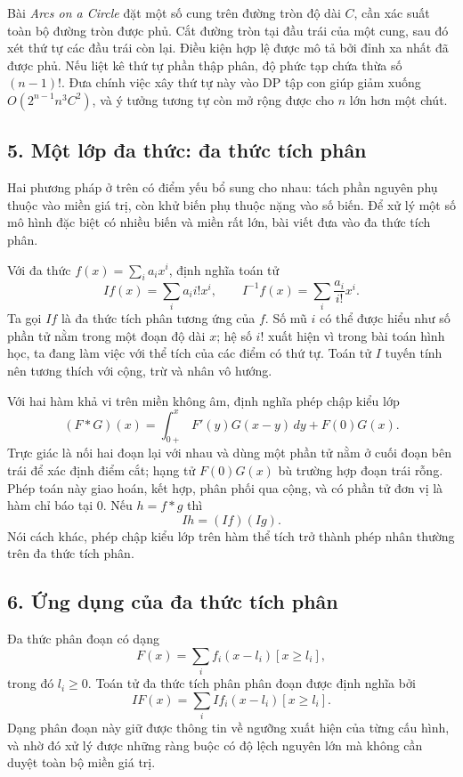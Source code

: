 \documentclass[11pt]{article}
\begin{document}
Bài \emph{Arcs on a Circle} đặt một số cung trên đường tròn độ dài \(C\), cần
xác suất toàn bộ đường tròn được phủ. Cắt đường tròn tại đầu trái của một cung,
sau đó xét thứ tự các đầu trái còn lại. Điều kiện hợp lệ được mô tả bởi đỉnh xa
nhất đã được phủ. Nếu liệt kê thứ tự phần thập phân, độ phức tạp chứa thừa số
\((n-1)!\). Đưa chính việc xây thứ tự này vào DP tập con giúp giảm xuống
\(O(2^{n-1}n^3C^2)\), và ý tưởng tương tự còn mở rộng được cho \(n\) lớn hơn
một chút.

\subsection*{5. Một lớp đa thức: đa thức tích phân}

Hai phương pháp ở trên có điểm yếu bổ sung cho nhau: tách phần nguyên phụ
thuộc vào miền giá trị, còn khử biến phụ thuộc nặng vào số biến. Để xử lý một
số mô hình đặc biệt có nhiều biến và miền rất lớn, bài viết đưa vào đa thức
tích phân.

Với đa thức \(f(x)=\sum_i a_i x^i\), định nghĩa toán tử
\[
  If(x)=\sum_i a_i i! x^i,
  \qquad
  I^{-1}f(x)=\sum_i \frac{a_i}{i!}x^i.
\]
Ta gọi \(If\) là đa thức tích phân tương ứng của \(f\). Số mũ \(i\) có thể được
hiểu như số phần tử nằm trong một đoạn độ dài \(x\); hệ số \(i!\) xuất hiện vì
trong bài toán hình học, ta đang làm việc với thể tích của các điểm có thứ tự.
Toán tử \(I\) tuyến tính nên tương thích với cộng, trừ và nhân vô hướng.

Với hai hàm khả vi trên miền không âm, định nghĩa phép chập kiểu lớp
\[
  (F*G)(x)=\int_{0+}^{x} F'(y)G(x-y)\,dy+F(0)G(x).
\]
Trực giác là nối hai đoạn lại với nhau và dùng một phần tử nằm ở cuối đoạn bên
trái để xác định điểm cắt; hạng tử \(F(0)G(x)\) bù trường hợp đoạn trái rỗng.
Phép toán này giao hoán, kết hợp, phân phối qua cộng, và có phần tử đơn vị là
hàm chỉ báo tại \(0\). Nếu \(h=f*g\) thì
\[
  Ih=(If)(Ig).
\]
Nói cách khác, phép chập kiểu lớp trên hàm thể tích trở thành phép nhân thường
trên đa thức tích phân.

\subsection*{6. Ứng dụng của đa thức tích phân}

Đa thức phân đoạn có dạng
\[
  F(x)=\sum_i f_i(x-l_i)[x\ge l_i],
\]
trong đó \(l_i\ge 0\). Toán tử đa thức tích phân phân đoạn được định nghĩa bởi
\[
  IF(x)=\sum_i I f_i(x-l_i)[x\ge l_i].
\]
Dạng phân đoạn này giữ được thông tin về ngưỡng xuất hiện của từng cấu hình,
và nhờ đó xử lý được những ràng buộc có độ lệch nguyên lớn mà không cần duyệt
toàn bộ miền giá trị.
\end{document}
